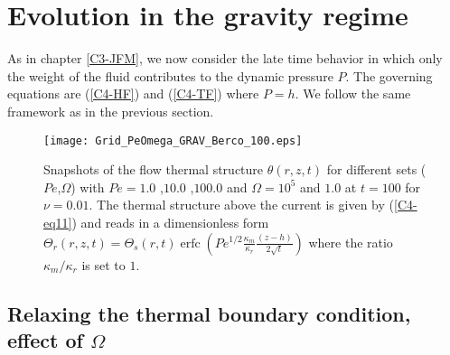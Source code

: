 \section{Evolution in the gravity regime}
\label{C4-sec:evol-grav-regime}

As in chapter \ref{C3-JFM}, we now  consider the late time behavior in
which only the weight of the fluid contributes to the dynamic pressure
$P$. The governing equations are (\ref{C4-HF}) and (\ref{C4-TF}) where
$P=h$. We follow the same framework as in the previous section.

\begin{figure}[h!]
  \begin{center}
    \graphicspath{ {/Users/thorey/Documents/These/Projet/Refroidissement/Skin_Model/Figure/Figure_Heating/} }
    \texttt{[image: Grid\_PeOmega\_GRAV\_Berco\_100.eps]}
    \caption{Snapshots of  the flow thermal  structure $\theta(r,z,t)$
      for  different  sets  ($Pe$,$\Omega$)  with  $Pe=  1.0$  ,$10.0$
      ,$100.0$   and   $\Omega=10^5$   and  $1.0$   at   $t=100$   for
      $\nu=0.01$. The thermal structure above  the current is given by
      (\ref{C4-eq11})    and   reads    in   a    dimensionless   form
      $\Theta_r(r,z,t)=\Theta_s(r,t)\operatorname{erfc}{\left(Pe^{1/2}\frac{\kappa_m}{\kappa_r}\frac{(z-h)}{2\sqrt{t}}\right)}$
      where the ratio $\kappa_m/\kappa_r$ is set to $1$.}
    \label{C4-Grid_PeOmega_Heating_GRAV}
  \end{center}
\end{figure}

\subsection{Relaxing  the   thermal  boundary  condition,   effect  of
  $\Omega$}
\label{C4-sec:infl-therm-bound}

